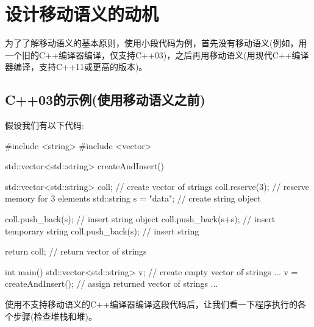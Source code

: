 \section{设计移动语义的动机}
为了了解移动语义的基本原则，使用小段代码为例，首先没有移动语义(例如，用一个旧的C++编译器编译，仅支持C++03)，之后再用移动语义(用现代C++编译器编译，支持C++11或更高的版本)。

\subsection{C++03的示例(使用移动语义之前)}

假设我们有以下代码:

\begin{cppcode}
#include <string>
#include <vector>

std::vector<std::string> createAndInsert()
{
	std::vector<std::string> coll; // create vector of strings
	coll.reserve(3); // reserve memory for 3 elements
	std::string s = "data"; // create string object

	coll.push_back(s); // insert string object
	coll.push_back(s+s); // insert temporary string
	coll.push_back(s); // insert string

	return coll; // return vector of strings
}

int main()
{
	std::vector<std::string> v; // create empty vector of strings
	...
	v = createAndInsert(); // assign returned vector of strings
	...
}
\end{cppcode}

使用不支持移动语义的C++编译器编译这段代码后，让我们看一下程序执行的各个步骤(检查堆栈和堆)。

